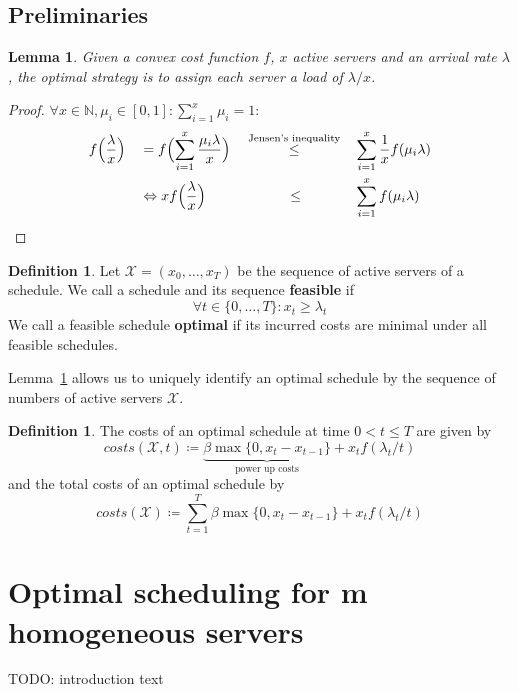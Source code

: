 \documentclass[hidelinks]{article}
\theoremstyle{plain}
\newtheorem{lem}[thm]{Lemma}
\theoremstyle{definition}
\newtheorem{defn}[thm]{Definition}
\theoremstyle{rem}
\newcommand{\mx}{\mathcal{X}}
\newcommand{\fromto}[2]{\{#1,\ldots,#2\}}
\begin{document}
\begin{sloppypar}
\subsection{Preliminaries}
\begin{lem}\label{lem:share}
	Given a convex cost function $f$, $x$ active servers and an arrival rate $\lambda$, the optimal strategy is to assign each server a load of $\lambda/x$.
\end{lem}
\begin{proof}
$\forall x\in\mathbb{N},\mu_i\in[0,1]:\sum\limits_{i=1}^{x}{\mu_i}=1:$
\begin{alignat*}{4}
	&f\Bigl(\frac{\lambda}{x}\Bigr)&&=f\Bigl(\sum\limits_{i=1}^x{\frac{\mu_i\lambda}{x}}\Bigr)&&\stackrel{\text{Jensen's inequality}}{\le}&&\sum\limits_{i=1}^x\frac{1}{x}f(\mu_i\lambda) \\
	&&&\Leftrightarrow xf\Bigl(\frac{\lambda}{x}\Bigr)&&\qquad\quad\le&&\sum\limits_{i=1}^xf(\mu_i\lambda)
\end{alignat*}
\end{proof}
\begin{defn} Let $\mx=(x_0,\ldots,x_T)$ be the sequence of active servers of a schedule. We call a schedule and its sequence \textbf{feasible} if 
\begin{equation*}
	\forall t\in\fromto{0}{T}: x_t\ge\lambda_t
\end{equation*}
We call a feasible schedule \textbf{optimal} if its incurred costs are minimal under all feasible schedules.
\end{defn}
Lemma~\ref{lem:share} allows us to uniquely identify an optimal schedule by the sequence of numbers of active servers $\mx$. 
\begin{defn}
The costs of an optimal schedule at time $0<t\le T$ are given by
\begin{equation*}
	costs(\mx,t)\coloneqq\underbrace{\beta\max\{0,x_{t}-x_{t-1}\}}_{\text{power up costs}}+x_tf(\lambda_t/t)
\end{equation*}
and the total costs of an optimal schedule by
\begin{equation*}
	costs(\mx)\coloneqq\sum\limits_{t=1}^{T}{\beta\max\{0,x_{t}-x_{t-1}\}+x_tf(\lambda_t/t)}
\end{equation*}
\end{defn}

\section{Optimal scheduling for m homogeneous servers}\label{sec:opt}
TODO: introduction text


\end{sloppypar}
\end{document}
